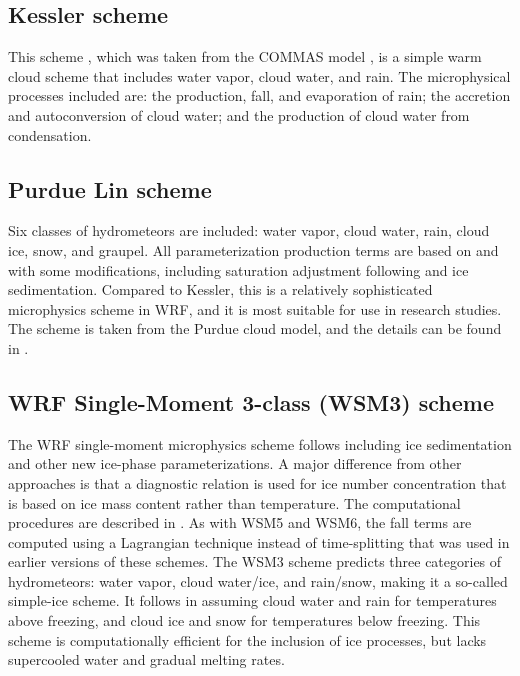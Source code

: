 \subsection{Kessler scheme}

This scheme \citep{kessler69}, which was taken from the COMMAS model
\citep{wicker95}, is a simple 
warm cloud scheme that includes water vapor, cloud water, and rain. 
The microphysical processes included are: the production, fall, and 
evaporation of rain; the accretion and autoconversion of cloud water;
and the production of cloud water from condensation.

\subsection{Purdue Lin scheme}

Six classes of hydrometeors are included: water vapor, cloud water, rain, cloud ice, 
snow, and graupel. All parameterization production terms are based on \citet{lin83}
and \citet{rutledge84} with some modifications, including saturation 
adjustment following \citet{tao89} and ice sedimentation. Compared to Kessler, this is a relatively 
sophisticated microphysics scheme in WRF, and it is most suitable for use 
in research studies. The scheme is taken from the Purdue cloud model, and 
the details can be found in \citet{chen02}.

\subsection{WRF Single-Moment 3-class (WSM3) scheme}

The WRF single-moment microphysics scheme follows \citet{hong04} including ice sedimentation and other new ice-phase parameterizations. A major difference from other approaches is that a diagnostic relation is used for ice number concentration that is based on ice mass content rather than temperature. The computational procedures are described in \citet{honglim06}. As with WSM5 and WSM6, the fall terms are computed using a Lagrangian technique instead of time-splitting that was used in earlier versions of these schemes. The WSM3 scheme predicts three categories of hydrometeors: water vapor, cloud water/ice, and rain/snow, making it a so-called simple-ice scheme. It follows \citet{dudhia89} in assuming cloud water and rain for temperatures above freezing, and cloud ice and snow for temperatures below freezing. This scheme is computationally efficient for the inclusion of ice processes, but lacks supercooled water and gradual melting rates. 

